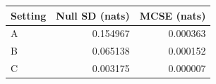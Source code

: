 \begin{tabular}{@{}lrr@{}}
\toprule
Setting & Null SD (nats) & MCSE (nats)\\
\midrule
A & 0.154967 & 0.000363\\
B & 0.065138 & 0.000152\\
C & 0.003175 & 0.000007\\
\bottomrule
\end{tabular}

